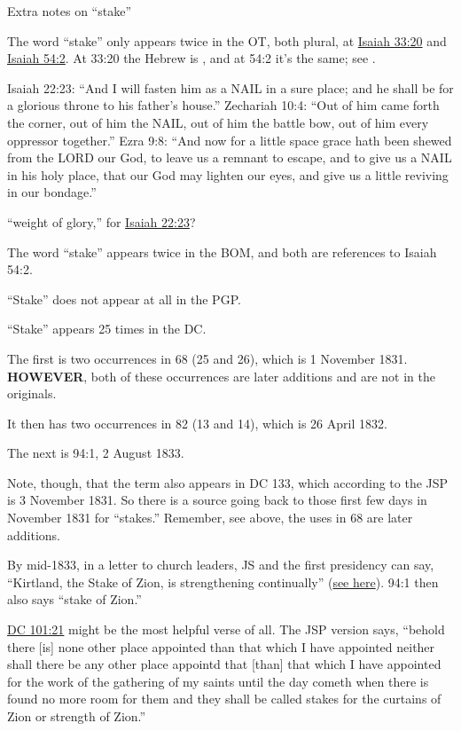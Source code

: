 \begin{compactitem}
			\item Extra notes on ``stake''
				\begin{compactitem}
					\item The word ``stake'' only appears twice in the OT, both plural, at \hyperref[ISAIAH-33-20]{Isaiah 33:20} and \hyperref[ISAIAH-54-2]{Isaiah 54:2}. At 33:20 the Hebrew is , and at 54:2 it's the same; see \hyperref[YATED]{}.
					\item Isaiah 22:23: ``And I will fasten him as a NAIL in a sure place; and he shall be for a glorious throne to his father’s house.''
						Zechariah 10:4: ``Out of him came forth the corner, out of him the NAIL, out of him the battle bow, out of him every oppressor together.''
						Ezra 9:8: ``And now for a little space grace hath been shewed from the LORD our God, to leave us a remnant to escape, and to give us a NAIL in his holy place, that our God may lighten our eyes, and give us a little reviving in our bondage.''
					\item ``weight of glory,'' for \hyperref[ISAIAH-22-23]{Isaiah 22:23}?
					\item The word ``stake'' appears twice in the BOM, and both are references to Isaiah 54:2.
					\item ``Stake'' does not appear at all in the PGP.
					\item ``Stake'' appears 25 times in the DC.
						\begin{compactitem}
							\item The first is two occurrences in 68 (25 and 26), which is 1 November 1831. \textbf{HOWEVER}, both of these occurrences are later additions and are not in the originals.
							\item It then has two occurrences in 82 (13 and 14), which is 26 April 1832.
							\item The next is 94:1, 2 August 1833.
							\item Note, though, that the term also appears in DC 133, which according to the JSP is 3 November 1831. So there is a source going back to those first few days in November 1831 for ``stakes.'' Remember, see above, the uses in 68 are later additions.
							\item By mid-1833, in a letter to church leaders, JS and the first presidency can say, ``Kirtland, the Stake of Zion, is strengthening continually'' (\hyperlink{EMS-1833-JS-25-JUN-1833-e}{see here}). 94:1 then also says ``stake of Zion.''
							\item \hyperref[DC101-21]{DC 101:21} might be the most helpful verse of all. The JSP version says, ``behold there [is] none other place appointed than that which I have appointed neither shall there be any other place appointd that [than] that which I have appointed for the work of the gathering of my saints until the day cometh when there is found no more room for them and they shall be called stakes for the curtains of Zion or strength of Zion.''

\end{compactitem}
\end{compactitem}
\end{compactitem}
